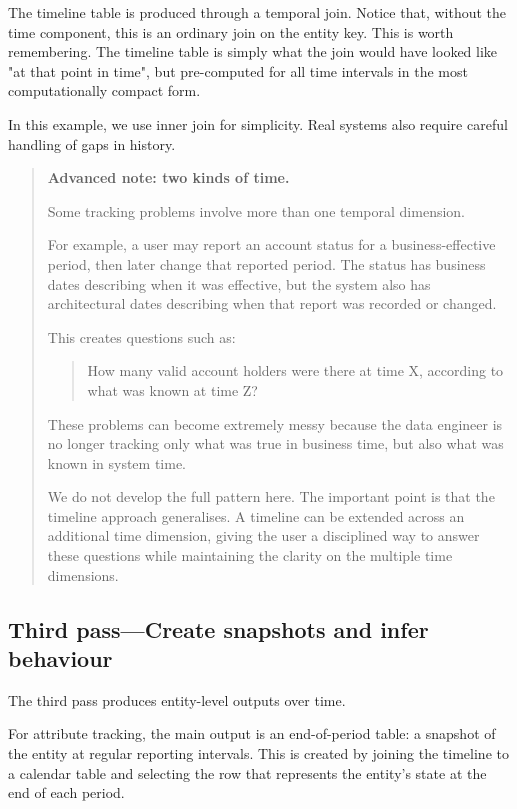 \documentclass[10pt,openany,10pt]{book}
\begin{document}
The timeline table is produced through a temporal join. Notice that,
without the time component, this is an ordinary join on the entity key.
This is worth remembering. The timeline table is simply what the join
would have looked like "at that point in time", but pre-computed for all
time intervals in the most computationally compact form.

In this example, we use inner join for simplicity. Real systems also
require careful handling of gaps in history.

\begin{quote}
\textbf{Advanced note: two kinds of time.}

Some tracking problems involve more than one temporal dimension.

For example, a user may report an account status for a
business-effective period, then later change that reported period. The
status has business dates describing when it was effective, but the
system also has architectural dates describing when that report was
recorded or changed.

This creates questions such as:

\begin{quote}
How many valid account holders were there at time X, according to what
was known at time Z?
\end{quote}

These problems can become extremely messy because the data engineer is
no longer tracking only what was true in business time, but also what
was known in system time.

We do not develop the full pattern here. The important point is that the
timeline approach generalises. A timeline can be extended across an
additional time dimension, giving the user a disciplined way to answer
these questions while maintaining the clarity on the multiple time
dimensions.
\end{quote}

\subsection{Third pass---Create snapshots and infer
behaviour}\label{third-passcreate-snapshots-and-infer-behaviour}

The third pass produces entity-level outputs over time.

For attribute tracking, the main output is an end-of-period table: a
snapshot of the entity at regular reporting intervals. This is created
by joining the timeline to a calendar table and selecting the row that
represents the entity's state at the end of each period.
\end{document}
